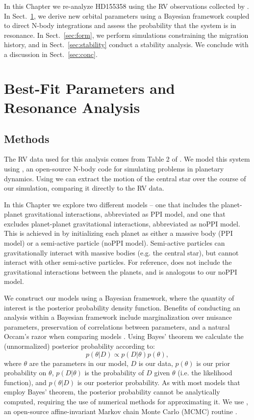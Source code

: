 In this Chapter we re-analyze HD155358 using the RV observations collected by \R.
In Sect.~\ref{sec:orb}, we derive new orbital parameters using a Bayesian framework coupled to direct N-body integrations and assess the probability that the system is in resonance.
In Sect.~\ref{sec:form}, we perform simulations constraining the migration history, and in Sect.~\ref{sec:stability} conduct a stability analysis. 
We conclude with a discussion in Sect.~\ref{sec:conc}.

\section{Best-Fit Parameters and Resonance Analysis}
\label{sec:orb}
\subsection{Methods}
\label{sec:Fit}
The RV data used for this analysis comes from Table 2 of \R. 
We model this system using \reb \citep{Rein2012}, an open-source N-body code for simulating problems in planetary dynamics.
Using \reb we can extract the motion of the central star over the course of our simulation, comparing it directly to the RV data. 

In this Chapter we explore two different models -- one that includes the planet-planet gravitational interactions, abbreviated as PPI model, and one that excludes planet-planet gravitational interactions, abbreviated as noPPI model. 
This is achieved in \reb by initializing each planet as either a massive body (PPI model) or a semi-active particle (noPPI model).
Semi-active particles can gravitationally interact with massive bodies (e.g. the central star), but cannot interact with other semi-active particles. 
For reference, \R does not include the gravitational interactions between the planets, and is analogous to our noPPI model.  

We construct our models using a Bayesian framework, where the quantity of interest is the posterior probability density function. 
Benefits of conducting an analysis within a Bayesian framework include marginalization over nuisance parameters, preservation of correlations between parameters, and a natural Occam's razor when comparing models \citep[see e.g.][for a full discussion]{Gregory2005}.
Using Bayes' theorem we calculate the (unnormalized) posterior probability according to:
\begin{equation*}
p(\theta | D) \propto p(D | \theta) p(\theta),
\label{eq:Bayes}
\end{equation*}
where $\theta$ are the parameters in our model, $D$ is our data, $p(\theta)$ is our prior probability on $\theta$, $p(D | \theta)$ is the probability of $D$ given $\theta$ (i.e. the likelihood function), and $p(\theta | D)$ is our posterior probability.
As with most models that employ Bayes' theorem, the posterior probability cannot be analytically computed, requiring the use of numerical methods for approximating it. 
We use \emcee, an open-source affine-invariant Markov chain Monte Carlo (MCMC) routine  \citep{Foreman-Mackey2013}.  

